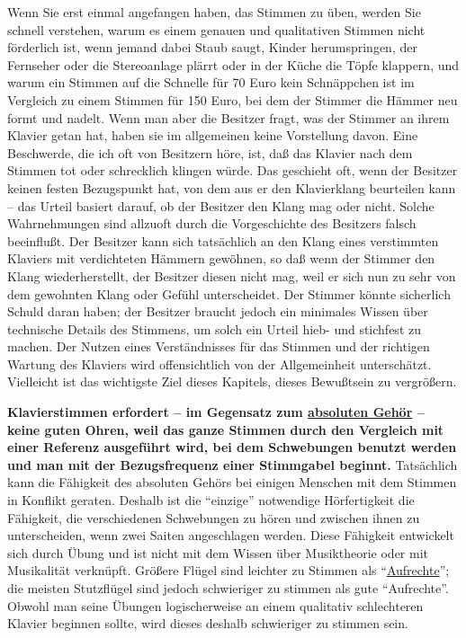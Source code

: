 Wenn Sie erst einmal angefangen haben, das Stimmen zu üben, werden Sie schnell verstehen, warum es einem genauen und qualitativen Stimmen nicht förderlich ist, wenn jemand dabei Staub saugt, Kinder herumspringen, der Fernseher oder die Stereoanlage plärrt oder in der Küche die Töpfe klappern, und warum ein Stimmen auf die Schnelle für 70 Euro kein Schnäppchen ist im Vergleich zu einem Stimmen für 150 Euro, bei dem der Stimmer die Hämmer neu formt und nadelt.
Wenn man aber die Besitzer fragt, was der Stimmer an ihrem Klavier getan hat, haben sie im allgemeinen keine Vorstellung davon.
Eine Beschwerde, die ich oft von Besitzern höre, ist, daß das Klavier nach dem Stimmen tot oder schrecklich klingen würde.
Das geschieht oft, wenn der Besitzer keinen festen Bezugspunkt hat, von dem aus er den Klavierklang beurteilen kann -- das Urteil basiert darauf, ob der Besitzer den Klang mag oder nicht.
Solche Wahrnehmungen sind allzuoft durch die Vorgeschichte des Besitzers falsch beeinflußt.
Der Besitzer kann sich tatsächlich an den Klang eines verstimmten Klaviers mit verdichteten Hämmern gewöhnen, so daß wenn der Stimmer den Klang wiederherstellt, der Besitzer diesen nicht mag, weil er sich nun zu sehr von dem gewohnten Klang oder Gefühl unterscheidet.
Der Stimmer könnte sicherlich Schuld daran haben; der Besitzer braucht jedoch ein minimales Wissen über technische Details des Stimmens, um solch ein Urteil hieb- und stichfest zu machen.
Der Nutzen eines Verständnisses für das Stimmen und der richtigen Wartung des Klaviers wird offensichtlich von der Allgemeinheit unterschätzt.
Vielleicht ist das wichtigste Ziel dieses Kapitels, dieses Bewußtsein zu vergrößern.

\textbf{Klavierstimmen erfordert -- im Gegensatz zum \hyperref[c1iii12]{absoluten Gehör} -- keine guten Ohren, weil das ganze Stimmen durch den Vergleich mit einer Referenz ausgeführt wird, bei dem Schwebungen benutzt werden und man mit der Bezugsfrequenz einer Stimmgabel beginnt.}
Tatsächlich kann die Fähigkeit des absoluten Gehörs bei einigen Menschen mit dem Stimmen in Konflikt geraten.
Deshalb ist die \enquote{einzige} notwendige Hörfertigkeit die Fähigkeit, die verschiedenen Schwebungen zu hören und zwischen ihnen zu unterscheiden, wenn zwei Saiten angeschlagen werden.
Diese Fähigkeit entwickelt sich durch Übung und ist nicht mit dem Wissen über Musiktheorie oder mit Musikalität verknüpft.
Größere Flügel sind leichter zu Stimmen als \enquote{\hyperref[upright]{Aufrechte}}; die meisten Stutzflügel sind jedoch schwieriger zu stimmen als gute \enquote{Aufrechte}.
Obwohl man seine Übungen logischerweise an einem qualitativ schlechteren Klavier beginnen sollte, wird dieses deshalb schwieriger zu stimmen sein.
 


